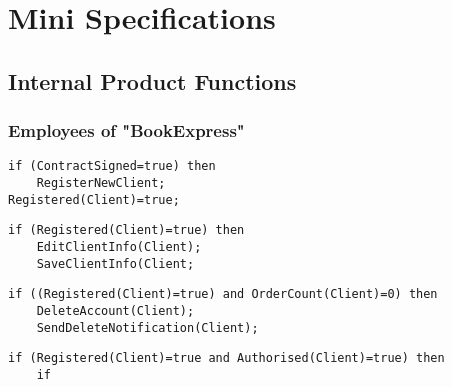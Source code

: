 \documentclass[12pt,a4paper]{article}
\begin{document}
\section{Mini Specifications}
\subsection{Internal Product Functions}
\subsubsection{Employees of "BookExpress"}
\begin{lstlisting}[caption=/PF00/Register Publisher or Book shop (client)]
if (ContractSigned=true) then  
	RegisterNewClient;
Registered(Client)=true;
\end{lstlisting}
\begin{lstlisting}[caption=/PF01/Edit client information]
if (Registered(Client)=true) then  
	EditClientInfo(Client);
	SaveClientInfo(Client;
\end{lstlisting}
\begin{lstlisting}[caption=/PF02/Delete Account]
if ((Registered(Client)=true) and OrderCount(Client)=0) then  
	DeleteAccount(Client);
	SendDeleteNotification(Client);
\end{lstlisting}
\begin{lstlisting}[caption=/PF10/Client places Order]
if (Registered(Client)=true and Authorised(Client)=true) then  
	if 
\end{lstlisting}
\end{document}

